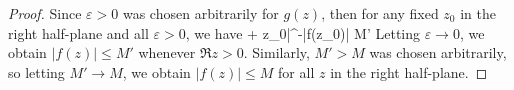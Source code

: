\documentclass[12pt]{article}
\theoremstyle{definition}
\newcommand{\eps}{\varepsilon}
\def\[#1\]{\begin{align*}#1\end{align*}}
\begin{document}
\begin{proof}
    Since $\eps > 0$ was chosen arbitrarily for $g(z)$, then for any fixed $z_0$ in the right half-plane and all $\eps > 0$, we have
    \[
        |1 + z_0|^{-\eps}|f(z_0)| \leq M'
    \]
    Letting $\eps \to 0$, we obtain $|f(z)| \leq M'$ whenever $\Re z > 0$. Similarly, $M' > M$ was chosen arbitrarily, so letting $M' \to M$, we obtain $|f(z)| \leq M$ for all $z$ in the right half-plane. 
    
\end{proof}
\end{document}

